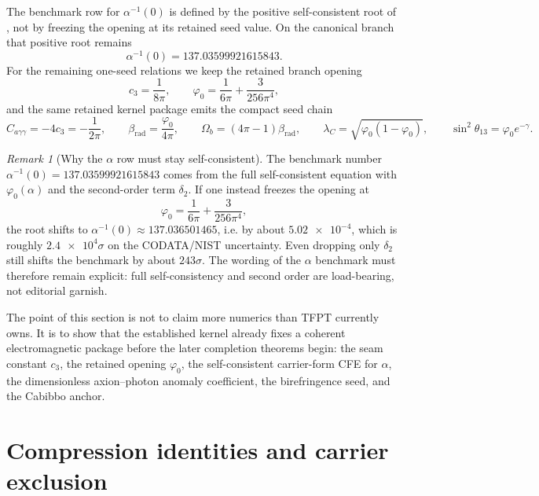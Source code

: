 \documentclass[11pt,a4paper]{article}
\theoremstyle{definition}
\theoremstyle{remark}
\newtheorem*{remark}{Remark}
\newcommand{\cthree}{c_3}
\newcommand{\phiz}{\varphi_0}
\begin{document}
The benchmark row for $\alpha^{-1}(0)$ is defined by the positive self-consistent root of , not by freezing the opening at its retained seed value. On the canonical branch that positive root remains
\[
\alpha^{-1}(0)=\num{137.03599921615843}.
\]
For the remaining one-seed relations we keep the retained branch opening
\begin{equation}
\label{eq:hard-kernel-values}
\cthree=\frac{1}{8\pi},
\qquad
\phiz=\frac{1}{6\pi}+\frac{3}{256\pi^4},
\end{equation}
and the same retained kernel package emits the compact seed chain
\begin{equation}
\label{eq:kernel-benchmark-formulas}
C_{a\gamma\gamma}=-4\cthree=-\frac{1}{2\pi},
\qquad
\beta_{\mathrm{rad}}=\frac{\phiz}{4\pi},
\qquad
\Omega_b=(4\pi-1)\beta_{\mathrm{rad}},
\qquad
\lambda_C=\sqrt{\phiz(1-\phiz)},
\qquad
\sin^2\theta_{13}=\phiz e^{-\gamma}.
\end{equation}
\begin{remark}[Why the $\alpha$ row must stay self-consistent]
The benchmark number $\alpha^{-1}(0)=\num{137.03599921615843}$ comes from the full self-consistent equation with $\phiz(\alpha)$ and the second-order term $\delta_2$. If one instead freezes the opening at
\[
\phiz=\frac{1}{6\pi}+\frac{3}{256\pi^4},
\]
the root shifts to $\alpha^{-1}(0)\approx \num{137.036501465}$, i.e. by about $\num{5.02e-4}$, which is roughly $\num{2.4e4}\sigma$ on the CODATA/NIST uncertainty. Even dropping only $\delta_2$ still shifts the benchmark by about $243\sigma$. The wording of the $\alpha$ benchmark must therefore remain explicit: full self-consistency and second order are load-bearing, not editorial garnish.
\end{remark}
\begin{tcolorbox}[colback=blue!3, colframe=blue!50!black, breakable,
    title={\textbf{Kernel-output package}}, fonttitle=\bfseries]
The point of this section is not to claim more numerics than TFPT currently owns. It is to show that the established kernel already fixes a coherent electromagnetic package before the later completion theorems begin: the seam constant $\cthree$, the retained opening $\phiz$, the self-consistent carrier-form CFE for $\alpha$, the dimensionless axion--photon anomaly coefficient, the birefringence seed, and the Cabibbo anchor.
\end{tcolorbox}

\section{Compression identities and carrier exclusion}
\end{document}
